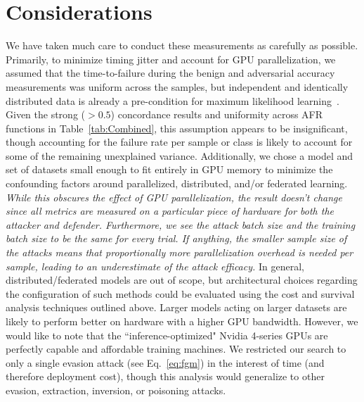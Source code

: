 \documentclass[conference]{IEEEtran}
\newcommand{\cm}[1]{\textit{{\color{blue}#1}}}
\begin{document}
\section{Considerations}
\label{considerations}
We have taken much care to conduct these measurements as carefully as possible. Primarily, to minimize timing jitter and account for GPU parallelization, we assumed that the time-to-failure during the benign and adversarial accuracy measurements was uniform across the samples, but independent and identically distributed data is already a pre-condition for maximum likelihood learning~\cite{ma2022state}. Given the strong ($>0.5$) concordance results and uniformity across AFR functions in Table~\ref{tab:Combined}, this assumption appears to be insignificant, though accounting for the failure rate per sample or class is likely to account for some of the remaining unexplained variance. Additionally, we chose a model and set of datasets small enough to fit entirely in GPU memory to minimize the confounding factors around parallelized, distributed, and/or federated learning. \cm{While this obscures the effect of GPU parallelization, the result doesn't change since all metrics are measured on a particular piece of hardware for both the attacker and defender. Furthermore, we see the attack batch size and the training batch size to be the same for every trial. If anything, the smaller sample size of the attacks means that proportionally more parallelization overhead is needed per sample, leading to an underestimate of the attack efficacy.} In general, distributed/federated models are out of scope, but architectural choices regarding the configuration of such methods could be evaluated using the cost and survival analysis techniques outlined above. Larger models acting on larger datasets are likely to perform better on hardware with a higher GPU bandwidth. However, we would like to note that the ``inference-optimized" Nvidia 4-series GPUs are perfectly capable and affordable training machines. We restricted our search to only a single evasion attack (see Eq.~\ref{eq:fgm}) in the interest of time (and therefore deployment cost), though this analysis would generalize to other evasion, extraction, inversion, or poisoning attacks.
\end{document}
